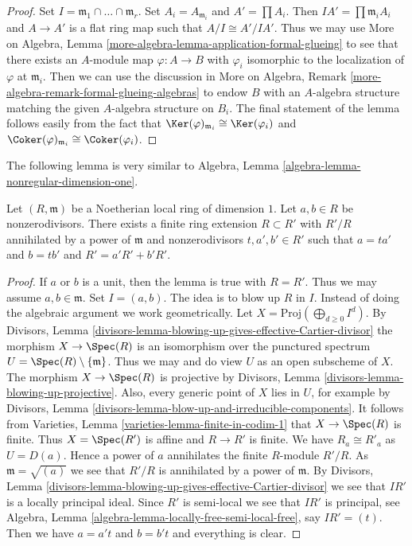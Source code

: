 \begin{proof}
Set $I = \mathfrak m_1 \cap \ldots \cap \mathfrak m_r$. Set
$A_i = A_{\mathfrak m_i}$ and $A' = \prod A_i$.
Then $IA' = \prod \mathfrak m_i A_i$ and $A \to A'$
is a flat ring map such that $A/I \cong A'/IA'$.
Thus we may use More on Algebra, Lemma
\ref{more-algebra-lemma-application-formal-glueing}
to see that there exists an $A$-module map $\varphi : A \to B$
with $\varphi_i$ isomorphic to the localization of $\varphi$
at $\mathfrak m_i$. Then we can use the discussion in
More on Algebra, Remark \ref{more-algebra-remark-formal-glueing-algebras}
to endow $B$ with an $A$-algebra structure
matching the given $A$-algebra structure on $B_i$.
The final statement of the lemma follows easily from
the fact that $\Ker(\varphi)_{\mathfrak m_i} \cong \Ker(\varphi_i)$
and $\Coker(\varphi)_{\mathfrak m_i} \cong \Coker(\varphi_i)$.
\end{proof}

\noindent
The following lemma is very similar to
Algebra, Lemma \ref{algebra-lemma-nonregular-dimension-one}.

\begin{lemma}
\label{lemma-Noetherian-domain-dim-1-two-elements}
Let $(R, \mathfrak m)$ be a Noetherian local ring of dimension $1$.
Let $a, b \in R$ be nonzerodivisors.
There exists a finite ring extension $R \subset R'$
with $R'/R$ annihilated by a power of $\mathfrak m$
and nonzerodivisors $t, a', b' \in R'$ such that
$a = ta'$ and $b = tb'$ and $R' = a'R' + b'R'$.
\end{lemma}

\begin{proof}
If $a$ or $b$ is a unit, then the lemma is true with $R = R'$.
Thus we may assume $a, b \in \mathfrak m$.
Set $I = (a, b)$. The idea is to blow up $R$ in $I$.
Instead of doing the algebraic argument we work geometrically.
Let $X = \text{Proj}(\bigoplus_{d \geq 0} I^d)$.
By Divisors, Lemma
\ref{divisors-lemma-blowing-up-gives-effective-Cartier-divisor}
the morphism $X \to \Spec(R)$ is an isomorphism over
the punctured spectrum $U = \Spec(R) \setminus \{\mathfrak m\}$.
Thus we may and do view $U$ as an open subscheme of $X$.
The morphism $X \to \Spec(R)$ is projective by
Divisors, Lemma \ref{divisors-lemma-blowing-up-projective}.
Also, every generic point of $X$ lies in $U$, for example
by Divisors, Lemma \ref{divisors-lemma-blow-up-and-irreducible-components}.
It follows from Varieties, Lemma \ref{varieties-lemma-finite-in-codim-1}
that $X \to \Spec(R)$ is finite. Thus $X = \Spec(R')$ is
affine and $R \to R'$ is finite. We have $R_a \cong R'_a$ as $U = D(a)$.
Hence a power of $a$ annihilates the finite $R$-module $R'/R$.
As $\mathfrak m = \sqrt{(a)}$ we see that $R'/R$ is annihilated
by a power of $\mathfrak m$. By
Divisors, Lemma \ref{divisors-lemma-blowing-up-gives-effective-Cartier-divisor}
we see that $IR'$ is a locally principal ideal.
Since $R'$ is semi-local we see that $IR'$ is principal,
see Algebra, Lemma \ref{algebra-lemma-locally-free-semi-local-free},
say $IR' = (t)$. Then we have $a = a't$ and $b = b't$ and everything is
clear.
\end{proof}

